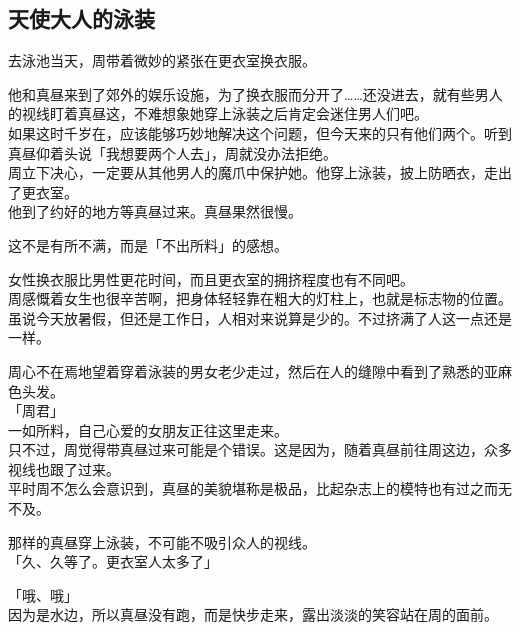 \subsection{天使大人的泳装}

去泳池当天，周带着微妙的紧张在更衣室换衣服。

他和真昼来到了郊外的娱乐设施，为了换衣服而分开了……还没进去，就有些男人的视线盯着真昼这，不难想象她穿上泳装之后肯定会迷住男人们吧。\\%

如果这时千岁在，应该能够巧妙地解决这个问题，但今天来的只有他们两个。听到真昼仰着头说「我想要两个人去」，周就没办法拒绝。\\

周立下决心，一定要从其他男人的魔爪中保护她。他穿上泳装，披上防晒衣，走出了更衣室。\\

他到了约好的地方等真昼过来。真昼果然很慢。

这不是有所不满，而是「不出所料」的感想。

女性换衣服比男性更花时间，而且更衣室的拥挤程度也有不同吧。\\

周感慨着女生也很辛苦啊，把身体轻轻靠在粗大的灯柱上，也就是标志物的位置。\\

虽说今天放暑假，但还是工作日，人相对来说算是少的。不过挤满了人这一点还是一样。

周心不在焉地望着穿着泳装的男女老少走过，然后在人的缝隙中看到了熟悉的亚麻色头发。\\

「周君」\\

一如所料，自己心爱的女朋友正往这里走来。\\

只不过，周觉得带真昼过来可能是个错误。这是因为，随着真昼前往周这边，众多视线也跟了过来。\\

平时周不怎么会意识到，真昼的美貌堪称是极品，比起杂志上的模特也有过之而无不及。

那样的真昼穿上泳装，不可能不吸引众人的视线。\\

「久、久等了。更衣室人太多了」

「哦、哦」\\

因为是水边，所以真昼没有跑，而是快步走来，露出淡淡的笑容站在周的面前。\\

